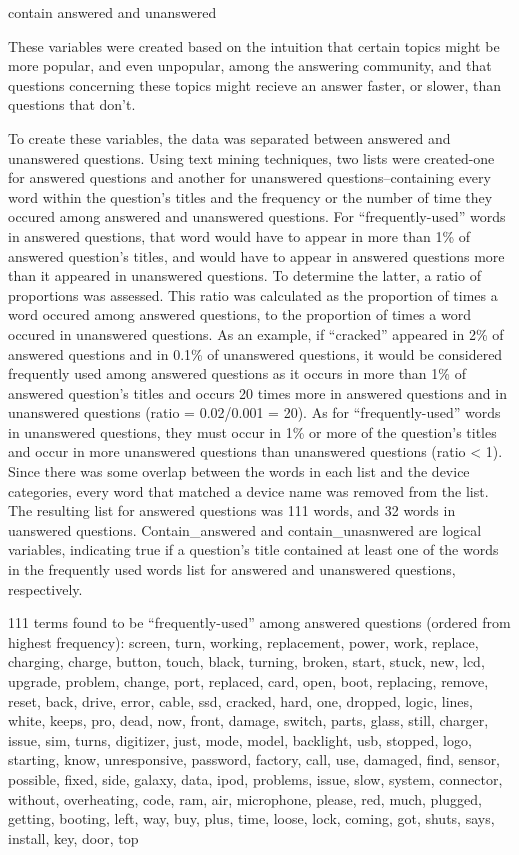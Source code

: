 \documentclass{article}
\begin{document}
contain answered and unanswered

  These variables were created based on the intuition that certain topics might be more popular, and even unpopular, among the answering community, and that questions concerning these topics might recieve an answer faster, or slower, than questions that don't. 
  
  To create these variables, the data was separated between answered and unanswered questions. Using text mining techniques, two lists were created-one for answered questions and another for unanswered questions--containing every word within the question's titles and the frequency or the number of time they occured among answered and unanswered questions. For ``frequently-used'' words in answered questions, that word would have to appear in more than 1\% of answered question's titles, and would have to appear in answered questions more than it appeared in unanswered questions. To determine the latter, a ratio of proportions was assessed. This ratio was calculated as the proportion of times a word occured among answered questions, to the proportion of times a word occured in unanswered questions. As an example, if ``cracked'' appeared in 2\% of answered questions and in 0.1\% of unanswered questions, it would be considered frequently used among answered questions as it occurs in more than 1\% of answered question's titles and occurs 20 times more in answered questions and in unanswered questions (ratio = 0.02/0.001 = 20). As for ``frequently-used'' words in unanswered questions, they must occur in 1\% or more of the question's titles and occur in more unanswered questions than unanswered questions (ratio < 1). Since there was some overlap between the words in each list and the device categories, every word that matched a device name was removed from the list. The resulting list for answered questions was 111 words, and 32 words in uanswered questions. Contain_answered and contain_unasnwered are logical variables, indicating true if a question's title contained at least one of the words in the frequently used words list for answered and unanswered questions, respectively. 
  
111 terms found to be ``frequently-used'' among answered questions (ordered from highest frequency): 
screen, turn, working, replacement, power, work, replace, charging, charge, button, touch, black, turning, broken, start, stuck, new, lcd, upgrade, problem, change, port, replaced, card, open, boot, replacing, remove, reset, back, drive, error, cable, ssd, cracked, hard, one, dropped, logic, lines, white, keeps, pro, dead, now, front, damage, switch, parts, glass, still, charger, issue, sim, turns, digitizer, just, mode, model, backlight, usb, stopped, logo, starting, know, unresponsive, password, factory, call, use, damaged, find, sensor, possible, fixed, side, galaxy, data, ipod, problems, issue, slow, system, connector, without, overheating, code, ram, air, microphone, please, red, much, plugged, getting, booting, left, way, buy, plus, time, loose, lock, coming, got, shuts, says, install, key, door, top
\end{document}
